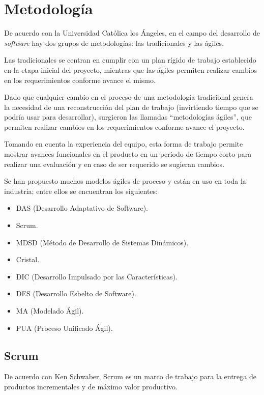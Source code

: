 
\section{Metodología}
De acuerdo con la Universidad Católica los Ángeles\cite{universidad_catolica_los_angeles_metodologidesarrollo_2020}, en el campo del desarrollo de \textit{software} hay dos grupos de metodologías: las tradicionales y las ágiles.


Las tradicionales se centran en cumplir con un plan rígido de trabajo establecido en la etapa inicial del proyecto, mientras que las ágiles permiten realizar cambios en los requerimientos conforme avance el mismo.


Dado que cualquier cambio en el proceso de una metodologia tradicional genera la necesidad de una reconstrucción del plan de trabajo (invirtiendo tiempo que se podría usar para desarrollar), surgieron las llamadas ``metodologías ágiles'', que permiten realizar cambios en los requerimientos conforme avance el proyecto. 


Tomando en cuenta la experiencia del equipo, esta forma de trabajo permite mostrar avances funcionales en el producto en un periodo de tiempo corto para realizar una evaluación y en caso de ser requerido se sugieran cambios.


Se han propuesto muchos modelos ágiles de proceso y están en uso en toda la industria; entre ellos se encuentran los siguientes:


\begin{itemize}
	\item DAS (Desarrollo Adaptativo de Software).
	\item Scrum.
	\item MDSD (Método de Desarrollo de Sistemas Dinámicos).
	\item Cristal.
	\item DIC (Desarrollo Impulsado por las Características).
	\item DES (Desarrollo Esbelto de Software).
	\item MA (Modelado Ágil).
	\item PUA (Proceso Unificado Ágil).
\end{itemize}

\subsection{Scrum}

De acuerdo con Ken Schwaber\cite{the_scrum_guide_definitive_2020}, Scrum es un marco de trabajo para la entrega de productos incrementales y de máximo valor productivo.

